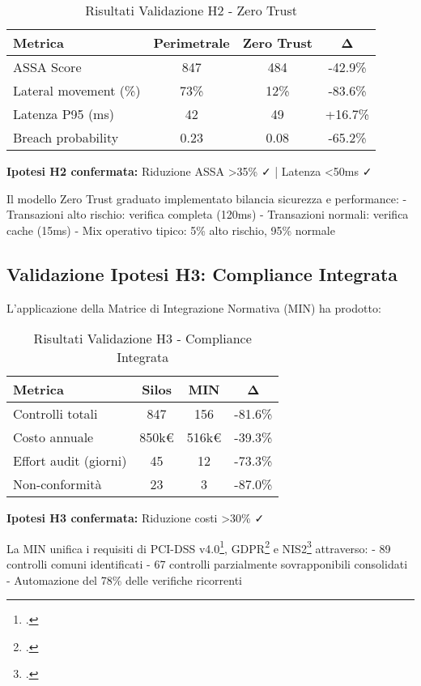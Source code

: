 \begin{table}[htbp]
\centering
\caption{Risultati Validazione H2 - Zero Trust}
\label{tab:h2_results}
\begin{tabular}{lccc}
\toprule
\textbf{Metrica} & \textbf{Perimetrale} & \textbf{Zero Trust} & \textbf{Δ} \\
\midrule
ASSA Score & 847 & 484 & -42.9\% \\
Lateral movement (\%) & 73\% & 12\% & -83.6\% \\
Latenza P95 (ms) & 42 & 49 & +16.7\% \\
Breach probability & 0.23 & 0.08 & -65.2\% \\
\bottomrule
\end{tabular}
\end{table}

\textbf{Ipotesi H2 confermata:} Riduzione ASSA >35\% ✓ | Latenza <50ms ✓

Il modello Zero Trust graduato implementato bilancia sicurezza e performance:
- Transazioni alto rischio: verifica completa (120ms)
- Transazioni normali: verifica cache (15ms)
- Mix operativo tipico: 5\% alto rischio, 95\% normale

\subsection{Validazione Ipotesi H3: Compliance Integrata}
\label{subsec:h3_risultati}

L'applicazione della Matrice di Integrazione Normativa (MIN) ha prodotto:

\begin{table}[htbp]
\centering
\caption{Risultati Validazione H3 - Compliance Integrata}
\label{tab:h3_results}
\begin{tabular}{lccc}
\toprule
\textbf{Metrica} & \textbf{Silos} & \textbf{MIN} & \textbf{Δ} \\
\midrule
Controlli totali & 847 & 156 & -81.6\% \\
Costo annuale & 850k€ & 516k€ & -39.3\% \\
Effort audit (giorni) & 45 & 12 & -73.3\% \\
Non-conformità & 23 & 3 & -87.0\% \\
\bottomrule
\end{tabular}
\end{table}

\textbf{Ipotesi H3 confermata:} Riduzione costi >30\% ✓

La MIN unifica i requisiti di PCI-DSS v4.0\footcite{pcidss2024}, GDPR\footcite{gdpr2016} e NIS2\footcite{nis2directive} attraverso:
- 89 controlli comuni identificati
- 67 controlli parzialmente sovrapponibili consolidati
- Automazione del 78\% delle verifiche ricorrenti

